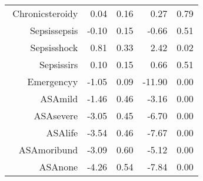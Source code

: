 \begin{tabular}{rrrrr}
$$  Chronic\-steroid\-y & 0.04 & 0.16 & 0.27 & 0.79 \\ 
  Sepsis\-sepsis & -0.10 & 0.15 & -0.66 & 0.51 \\ 
  Sepsis\-shock & 0.81 & 0.33 & 2.42 & 0.02 \\ 
  Sepsis\-sirs & 0.10 & 0.15 & 0.66 & 0.51 \\ 
  Emergency\-y & -1.05 & 0.09 & -11.90 & 0.00 \\ 
  ASA\-mild & -1.46 & 0.46 & -3.16 & 0.00 \\ 
  ASA\-severe & -3.05 & 0.45 & -6.70 & 0.00 \\ 
  ASA\-life & -3.54 & 0.46 & -7.67 & 0.00 \\ 
  ASA\-moribund & -3.09 & 0.60 & -5.12 & 0.00 \\ 
  ASA\-none & -4.26 & 0.54 & -7.84 & 0.00 \\ 
   \hline
\end{tabular}


